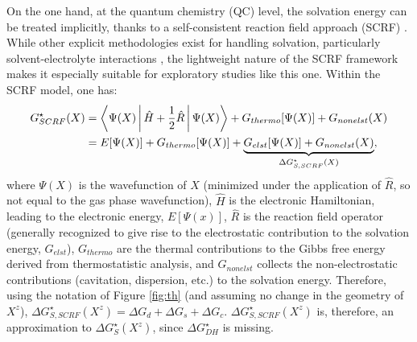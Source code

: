 \documentclass[review,preprint]{elsarticle}
\begin{document}
On the one hand, at the quantum chemistry (QC) level, the solvation energy can be treated implicitly, thanks to a self-consistent reaction field approach (SCRF) \cite{herbertDielectricContinuumMethods2021}. While other explicit methodologies exist for handling solvation, particularly solvent-electrolyte interactions  \cite{eisenhartSpecificIonSolvation2021,yuSolvationStructureDynamics2022,yaoApplyingClassicalInitio2022}, the lightweight nature of the SCRF framework makes it especially suitable for exploratory studies like this one. Within the SCRF model, one has: \begin{align}
	G^\star_{SCRF}(X) &= \Braket{\Psi(X)|{\hat{H}+\frac{1}{2}\hat{R}}|\Psi(X)} + G_{thermo}[\Psi(X)] + G_{nonelst}(X) \nonumber\\
	&= E[\Psi(X)] + G_{thermo}[\Psi(X)] + \underbrace{G_{elst}[\Psi(X)] + G_{nonelst}(X)}_{\Delta G^\star_{S,SCRF}(X)}, \label{eq:scrf}
\end{align}
where $\Psi(X)$ is the wavefunction of $X$ (minimized under the application of $\hat R$, so not equal to the gas phase wavefunction), $\hat H$ is the electronic Hamiltonian, leading to the electronic energy, $E[\Psi(x)]$, $\hat R$ is the reaction field operator (generally recognized to give rise to the electrostatic contribution to the solvation energy, $G_{elst}$), $G_{thermo}$ are the thermal contributions to the Gibbs free energy derived from thermostatistic analysis, and $G_{nonelst}$ collects the non-electrostatic contributions (cavitation, dispersion, etc.) to the solvation energy. Therefore, using the notation of Figure \ref{fig:th} (and assuming no change in the geometry of $X^z$), $ \Delta G^\star_{S,SCRF}(X^z) = \Delta G_d + \Delta G_s + \Delta G_{c}$. $ \Delta G^\star_{S,SCRF}(X^z)$ is, therefore, an approximation to $\Delta G^\star_S(X^z)$, since $\Delta G^\star_{DH}$ is missing. 
\end{document}
